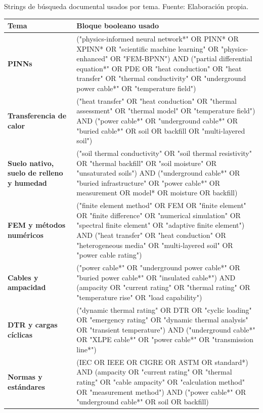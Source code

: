 \documentclass[11pt,a4paper,oneside]{report}
\renewcommand{\arraystretch}{1.18}
\begin{document}
\begin{singlespace}
\clearpage
\begin{landscape}
\thispagestyle{empty}
\begin{center}
\captionsetup{type=table,hypcap=false}
\caption{Strings de búsqueda documental usados por tema. Fuente: Elaboración propia.}
\label{tab:strings-documentales}
\vspace{0.4em}
\footnotesize
\setlength{\tabcolsep}{5pt}
\renewcommand{\arraystretch}{1.22}
\begin{tabularx}{\linewidth}{>{\bfseries}L{4.1cm}>{\ttfamily\scriptsize\RaggedRight\arraybackslash}X}
\toprule
\normalfont\bfseries Tema & \normalfont\bfseries Bloque booleano usado \\
\midrule
PINNs & ("physics-informed neural network*" OR PINN* OR XPINN* OR "scientific machine learning" OR "physics-enhanced" OR "FEM-BPNN") AND ("partial differential equation*" OR PDE OR "heat conduction" OR "heat transfer" OR "thermal conductivity" OR "underground power cable*" OR "temperature field") \\
\addlinespace[0.35em]
Transferencia de calor & ("heat transfer" OR "heat conduction" OR "thermal assessment" OR "thermal model" OR "temperature field") AND ("power cable*" OR "underground cable*" OR "buried cable*" OR soil OR backfill OR "multi-layered soil") \\
\addlinespace[0.35em]
Suelo nativo, suelo de relleno y humedad & ("soil thermal conductivity" OR "soil thermal resistivity" OR "thermal backfill" OR "soil moisture" OR "unsaturated soils") AND ("underground cable*" OR "buried infrastructure" OR "power cable*" OR measurement OR model* OR moisture OR backfill) \\
\addlinespace[0.35em]
FEM y métodos numéricos & ("finite element method" OR FEM OR "finite element" OR "finite difference" OR "numerical simulation" OR "spectral finite element" OR "adaptive finite element") AND ("heat transfer" OR "heat conduction" OR "heterogeneous media" OR "multi-layered soil" OR "power cable rating") \\
\addlinespace[0.35em]
Cables y ampacidad & ("power cable*" OR "underground power cable*" OR "buried power cable*" OR "insulated cable*") AND (ampacity OR "current rating" OR "thermal rating" OR "temperature rise" OR "load capability") \\
\addlinespace[0.35em]
DTR y cargas cíclicas & ("dynamic thermal rating" OR DTR OR "cyclic loading" OR "emergency rating" OR "dynamic thermal analysis" OR "transient temperature") AND ("underground cable*" OR "XLPE cable*" OR "power cable*" OR "transmission line*") \\
\addlinespace[0.35em]
Normas y estándares & (IEC OR IEEE OR CIGRE OR ASTM OR standard*) AND (ampacity OR "current rating" OR "thermal rating" OR "cable ampacity" OR "calculation method" OR "measurement method") AND ("power cable*" OR "underground cable*" OR soil OR backfill) \\
\bottomrule
\end{tabularx}


\end{center}
\end{landscape}
\end{singlespace}
\end{document}
